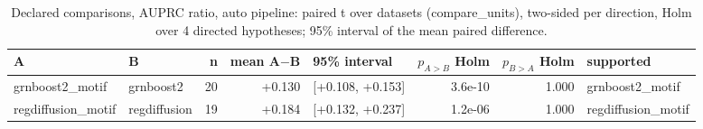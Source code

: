 \begin{table}[H]\centering\small
\caption{Declared comparisons, AUPRC ratio, auto pipeline: paired t over datasets (compare\_units), two-sided per direction, Holm over 4 directed hypotheses; 95\% interval of the mean paired difference.}
\begin{tabular}{llrrlrrl}\toprule
A & B & n & mean A$-$B & 95\% interval & $p_{A>B}$ Holm & $p_{B>A}$ Holm & supported \\ \midrule
grnboost2\_motif & grnboost2 & 20 & +0.130 & [+0.108, +0.153] & 3.6e-10 & 1.000 & grnboost2\_motif \\
regdiffusion\_motif & regdiffusion & 19 & +0.184 & [+0.132, +0.237] & 1.2e-06 & 1.000 & regdiffusion\_motif \\
\bottomrule\end{tabular}\end{table}
